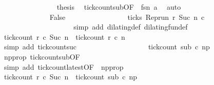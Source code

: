 \begin{isabellebody}
\ \ \ \ \ \ \ \ \ \ \ \ \ \ \isamarkupfalse%
\ {\isacharquery}thesis\ \isamarkupfalse%
\ tick{\isacharunderscore}count{\isacharunderscore}sub{\isacharbrackleft}OF\ {\isacharasterisk}{\isacharbrackright}\ fsn\ a\ \isamarkupfalse%
\ auto\isanewline
\ \ \ \ \ \ \ \ \ \ \isamarkupfalse%
\isanewline
\ \ \ \ \ \ \ \ \ \ \ \ \isamarkupfalse%
\ False\ %
\isanewline
\ \ \ \ \ \ \ \ \ \ \ \ \ \ \isamarkupfalse%
\ {\isacartoucheopen}{\isasymnot}ticks\ {\isacharparenleft}{\isacharparenleft}Rep{\isacharunderscore}run\ r{\isacharparenright}\ {\isacharparenleft}Suc\ n{\isacharparenright}\ c\isanewline
\ \ \ \ \ \ \ \ \ \ \ \ \ \ \ \ \isamarkupfalse%
\ {\isacharasterisk}\ \isamarkupfalse%
\ {\isacharparenleft}simp\ add{\isacharcolon}\ dilating{\isacharunderscore}def\ dilating{\isacharunderscore}fun{\isacharunderscore}def{\isacharparenright}\isanewline
\ \ \ \ \ \ \ \ \ \ \ \ \ \ \isamarkupfalse%
\ {\isacartoucheopen}tick{\isacharunderscore}count\ r\ c\ {\isacharparenleft}Suc\ n{\isacharparenright}\ {\isacharequal}\ tick{\isacharunderscore}count\ r\ c\ n{\isacartoucheclose}\isanewline
\ \ \ \ \ \ \ \ \ \ \ \ \ \ \ \ \isamarkupfalse%
\ {\isacharparenleft}simp\ add{\isacharcolon}\ tick{\isacharunderscore}count{\isacharunderscore}suc{\isacharparenright}\isanewline
\ \ \ \ \ \ \ \ \ \ \ \ \ \ \isamarkupfalse%
\ \isamarkupfalse%
\ {\isacartoucheopen}{\isachardot}{\isachardot}{\isachardot}\ {\isacharequal}\ tick{\isacharunderscore}count\ sub\ c\ n\isactrlsub p{\isacartoucheclose}\ \isamarkupfalse%
\ np{\isacharunderscore}prop\ tick{\isacharunderscore}count{\isacharunderscore}sub{\isacharbrackleft}OF\ {\isacharasterisk}{\isacharbrackright}\isanewline
\ \ \ \ \ \ \ \ \ \ \ \ \ \ \ \ \isamarkupfalse%
\ {\isacharparenleft}simp\ add{\isacharcolon}\ tick{\isacharunderscore}count{\isacharunderscore}latest{\isacharbrackleft}OF\ {\isacharasterisk}\ np{\isacharunderscore}prop{\isacharbrackright}{\isacharparenright}\isanewline
\ \ \ \ \ \ \ \ \ \ \ \ \ \ \isamarkupfalse%
\ \isamarkupfalse%
\ {\isacartoucheopen}tick{\isacharunderscore}count\ r\ c\ {\isacharparenleft}Suc\ n{\isacharparenright}\ {\isacharequal}\ tick{\isacharunderscore}count\ sub\ c\ n\isactrlsub p{\isacartoucheclose}\ \isacommand{{\isachardot}}\isamarkupfalse%

\end{isabellebody}
